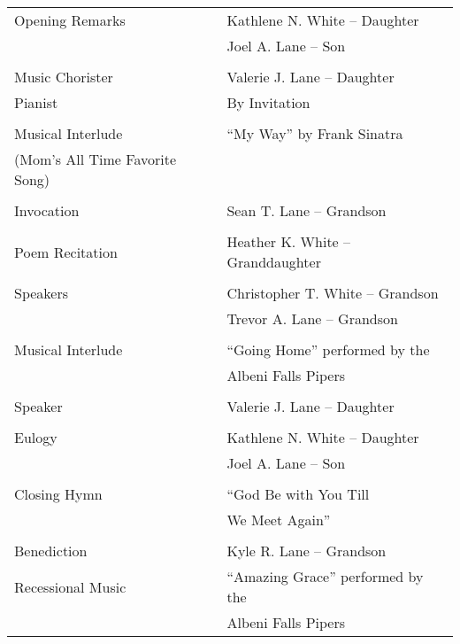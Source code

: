 \documentclass[12pt]{extarticle}
\begin{document}
\begin{tabular}{ l l }
	Opening Remarks 				& Kathlene N. White -- Daughter \\ 
    								& Joel A. Lane -- Son \\
									& \\
	Music Chorister 				& Valerie J. Lane -- Daughter \\
	Pianist 						& By Invitation \\
									& \\
	Musical Interlude 				& ``My Way'' by Frank Sinatra \\
	(Mom's All Time Favorite Song)  & \\
									& \\
	Invocation 						& Sean T. Lane -- Grandson \\
									& \\
	Poem Recitation 				& Heather K. White -- Granddaughter \\
									& \\
	Speakers 						& Christopher T. White -- Grandson \\
									& Trevor A. Lane -- Grandson \\
									& \\
	Musical Interlude 				& ``Going Home'' performed by the \\
									& Albeni Falls Pipers \\
									& \\
	Speaker 						& Valerie J. Lane -- Daughter \\
									& \\
	Eulogy 							& Kathlene N. White -- Daughter \\
									& Joel A. Lane -- Son \\
									& \\
	Closing Hymn 					& ``God Be with You Till \\
									& We Meet Again'' \\
									& \\
	Benediction 					& Kyle R. Lane -- Grandson \\
	Recessional Music				& ``Amazing Grace'' performed by the \\
									& Albeni Falls Pipers \\
\end{tabular}

\vspace{0.5cm}

\begin{center}
\end{center}
\end{document}
